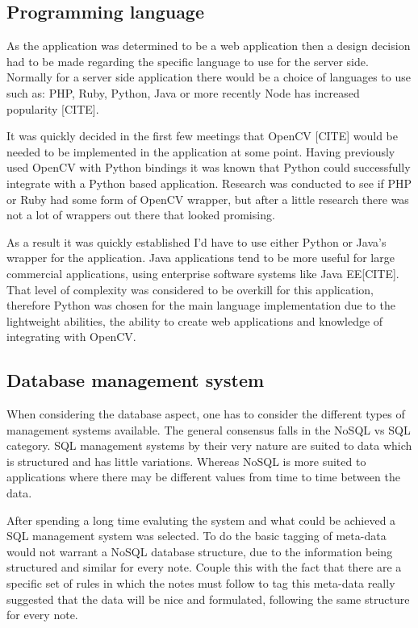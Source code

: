 \subsection{Programming language}
As the application was determined to be a web application then a design decision had to be made regarding the specific language to use for the server side. Normally for a server side application there would be a choice of languages to use such as: PHP, Ruby, Python, Java or more recently Node has increased popularity [CITE].

It was quickly decided in the first few meetings that OpenCV [CITE] would be needed to be implemented in the application at some point. Having previously used OpenCV with Python bindings it was known that Python could successfully integrate with a Python based application. Research was conducted to see if PHP or Ruby had some form of OpenCV wrapper, but after a little research there was not a lot of wrappers out there that looked promising. 

As a result it was quickly established I'd have to use either Python or Java's wrapper for the application. Java applications tend to be more useful for large commercial applications, using enterprise software systems like Java EE[CITE]. That level of complexity was considered to be overkill for this application, therefore Python was chosen for the main language implementation due to the lightweight abilities, the ability to create web applications and knowledge of integrating with OpenCV.
\subsection{Database management system}
When considering the database aspect, one has to consider the different types of management systems available. The general consensus falls in the NoSQL vs SQL category. SQL management systems by their very nature are suited to data which is structured and has little variations. Whereas NoSQL is more suited to applications where there may be different values from time to time between the data.

After spending a long time evaluting the system and what could be achieved a SQL management system was selected. To do the basic tagging of meta-data would not warrant a NoSQL database structure, due to the information being structured and similar for every note. Couple this with the fact that there are a specific set of rules in which the notes must follow to tag this meta-data really suggested that the data will be nice and formulated, following the same structure for every note. 

